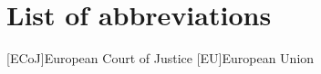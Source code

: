 \chapter*{List of abbreviations}
\begin{acronym}[ECoJ]\itemsep0pt
	[ECoJ]{European Court of Justice}
	[EU]{European Union}
\end{acronym}
